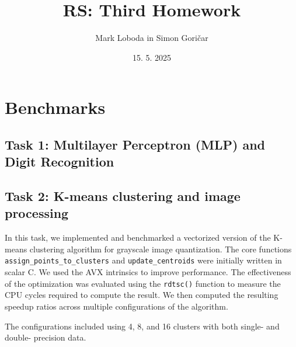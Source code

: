 \documentclass[10pt]{article}
\title{RS: Third Homework}
\author{
    Mark Loboda in Simon Goričar
}
\date{15. 5. 2025}
\begin{document}
\maketitle

\section{Benchmarks}

\subsection{Task 1: Multilayer Perceptron (MLP) and Digit Recognition}



\subsection{Task 2: K-means clustering and image processing}
In this task, we implemented and benchmarked a vectorized version of the K-means clustering algorithm for grayscale image quantization. The core functions \texttt{assign\_points\_to\_clusters} and \texttt{update\_centroids} were initially written in scalar C. We used the AVX intrinsics to improve performance. The effectiveness of the optimization was evaluated using the \texttt{rdtsc()} function to measure the CPU cycles required to compute the result. We then computed the resulting speedup ratios across multiple configurations of the algorithm.

The configurations included using 4, 8, and 16 clusters with both single- and double- precision data.
\end{document}
